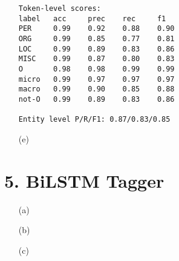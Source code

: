 \documentclass{article}
\begin{document}
\begin{itemize}
\begin{verbatim}
Token-level scores:
label	acc  	prec 	rec  	f1   
PER  	0.99 	0.92 	0.88 	0.90 
ORG  	0.99 	0.85 	0.77 	0.81 
LOC  	0.99 	0.89 	0.83 	0.86 
MISC 	0.99 	0.87 	0.80 	0.83 
O    	0.98 	0.98 	0.99 	0.99 
micro	0.99 	0.97 	0.97 	0.97 
macro	0.99 	0.90 	0.85 	0.88 
not-O	0.99 	0.89 	0.83 	0.86 

Entity level P/R/F1: 0.87/0.83/0.85

    \end{verbatim}

    \item[(e)] 
\end{itemize}

\section*{5. BiLSTM Tagger}

\begin{itemize}
    \item[(a)]
    \item[(b)]
    \item[(c)]
\end{itemize}
\end{document}
